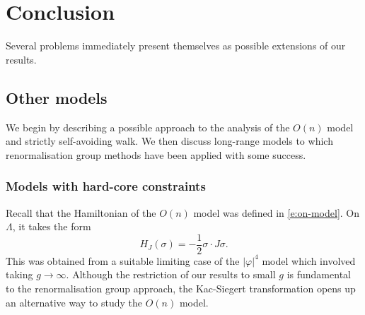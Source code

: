 \chapter{Conclusion}

Several problems immediately present themselves as possible extensions of
our results.


\section{Other models}

We begin by describing a possible approach to the analysis of the $O(n)$ model
and strictly self-avoiding walk. We then discuss long-range models to which
renormalisation group methods have been applied with some success.


\subsection{Models with hard-core constraints}

Recall that the Hamiltonian of the $O(n)$ model was defined in \eqref{e:on-model}.
On $\Lambda$, it takes the form
\begin{equation}
H_J(\sigma)
	=
-\frac12 \sigma \cdot J \sigma.
\end{equation}
This was obtained from a suitable limiting case of the $|\varphi|^4$ model which involved
taking $g\to\infty$. Although the restriction of our results to small $g$ is fundamental
to the renormalisation group approach, the Kac-Siegert transformation opens up an
alternative way to study the $O(n)$ model.

